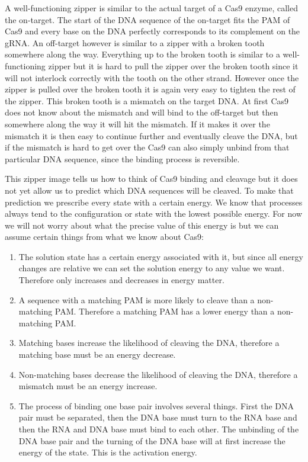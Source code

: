 
A well-functioning zipper is similar to the actual target of a Cas9 enzyme, called the on-target. The start of the DNA sequence of the on-target fits the PAM of Cas9 and every base on the DNA perfectly corresponds to its complement on the gRNA. An off-target however is similar to a zipper with a broken tooth somewhere along the way. Everything up to the broken tooth is similar to a well-functioning zipper but it is hard to pull the zipper over the broken tooth since it will not interlock correctly with the tooth on the other strand. However once the zipper is pulled over the broken tooth it is again very easy to tighten the rest of the zipper. This broken tooth is a mismatch on the target DNA. At first Cas9 does not know about the mismatch and will bind to the off-target but then somewhere along the way it will hit the mismatch. If it makes it over the mismatch it is then easy to continue further and eventually cleave the DNA, but if the mismatch is hard to get over the Cas9 can also simply unbind from that particular DNA sequence, since the binding process is reversible.

This zipper image tells us how to think of Cas9 binding and cleavage but it does not yet allow us to predict which DNA sequences will be cleaved. To make that prediction we prescribe every state with a certain energy. We know that processes always tend to the configuration or state with the lowest possible energy. For now we will not worry about what the precise value of this energy is but we can assume certain things from what we know about Cas9:

\begin{enumerate}
\item The solution state has a certain energy associated with it, but since all energy changes are relative we can set the solution energy to any value we want. Therefore only increases and decreases in energy matter.
\item A sequence with a matching PAM is more likely to cleave than a non-matching PAM. Therefore a matching PAM has a lower energy than a non-matching PAM.
\item Matching bases increase the likelihood of cleaving the DNA, therefore a matching base must be an energy decrease.
\item Non-matching bases decrease the likelihood of cleaving the DNA, therefore a mismatch must be an energy increase.
\item The process of binding one base pair involves several things. First the DNA pair must be separated, then the DNA base must turn to the RNA base and then the RNA and DNA base must bind to each other. The unbinding of the DNA base pair and the turning of the DNA base will at first increase the energy of the state. This is the activation energy.
\end{enumerate}

